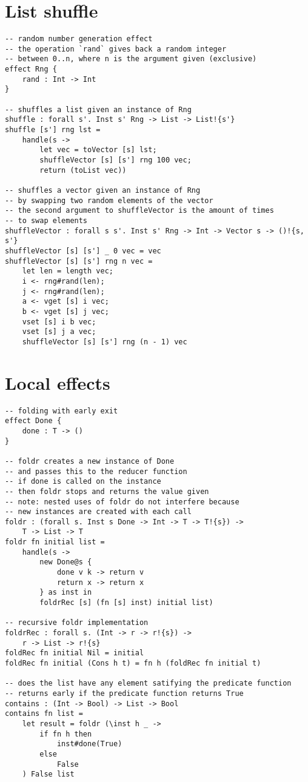 \section{List shuffle}
\begin{verbatim}
-- random number generation effect
-- the operation `rand` gives back a random integer
-- between 0..n, where n is the argument given (exclusive)
effect Rng {
	rand : Int -> Int
}

-- shuffles a list given an instance of Rng
shuffle : forall s'. Inst s' Rng -> List -> List!{s'}
shuffle [s'] rng lst =
	handle(s ->
		let vec = toVector [s] lst;
		shuffleVector [s] [s'] rng 100 vec;
		return (toList vec))

-- shuffles a vector given an instance of Rng
-- by swapping two random elements of the vector
-- the second argument to shuffleVector is the amount of times
-- to swap elements
shuffleVector : forall s s'. Inst s' Rng -> Int -> Vector s -> ()!{s, s'}
shuffleVector [s] [s'] _ 0 vec = vec
shuffleVector [s] [s'] rng n vec =
	let len = length vec;
	i <- rng#rand(len);
	j <- rng#rand(len);
	a <- vget [s] i vec;
	b <- vget [s] j vec;
	vset [s] i b vec;
	vset [s] j a vec;
	shuffleVector [s] [s'] rng (n - 1) vec
\end{verbatim}

\section{Local effects}
\begin{verbatim}
-- folding with early exit
effect Done {
	done : T -> ()
}

-- foldr creates a new instance of Done
-- and passes this to the reducer function
-- if done is called on the instance
-- then foldr stops and returns the value given
-- note: nested uses of foldr do not interfere because
-- new instances are created with each call
foldr : (forall s. Inst s Done -> Int -> T -> T!{s}) ->
	T -> List -> T
foldr fn initial list =
	handle(s ->
		new Done@s {
			done v k -> return v
			return x -> return x
		} as inst in
		foldrRec [s] (fn [s] inst) initial list)

-- recursive foldr implementation
foldrRec : forall s. (Int -> r -> r!{s}) ->
	r -> List -> r!{s}
foldRec fn initial Nil = initial
foldRec fn initial (Cons h t) = fn h (foldRec fn initial t)

-- does the list have any element satifying the predicate function
-- returns early if the predicate function returns True
contains : (Int -> Bool) -> List -> Bool
contains fn list =
	let result = foldr (\inst h _ ->
		if fn h then
			inst#done(True)
		else
			False
	) False list
\end{verbatim}
